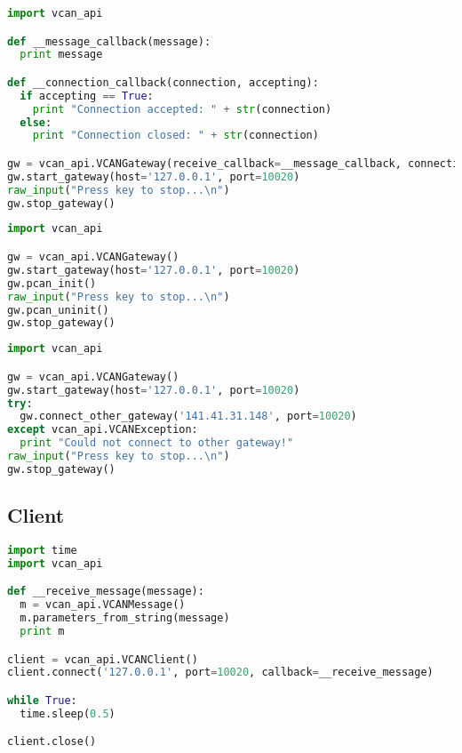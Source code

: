 \begin{lstlisting}[frame=single, language=Python, basicstyle=\footnotesize, caption={Gateway mit Callbacks}, label={lst:bsp_gateway2}]
import vcan_api

def __message_callback(message):
  print message

def __connection_callback(connection, accepting):
  if accepting == True:
    print "Connection accepted: " + str(connection)
  else:
    print "Connection closed: " + str(connection)

gw = vcan_api.VCANGateway(receive_callback=__message_callback, connection_callback=__connection_callback)
gw.start_gateway(host='127.0.0.1', port=10020)
raw_input("Press key to stop...\n")
gw.stop_gateway()
\end{lstlisting}

\begin{lstlisting}[frame=single, language=Python, basicstyle=\footnotesize, caption={Gateway mit PCAN-Anbindung}, label={lst:bsp_gateway3}]
import vcan_api

gw = vcan_api.VCANGateway()
gw.start_gateway(host='127.0.0.1', port=10020)
gw.pcan_init()
raw_input("Press key to stop...\n")
gw.pcan_uninit()
gw.stop_gateway()
\end{lstlisting}

\begin{lstlisting}[frame=single, language=Python, basicstyle=\footnotesize, caption={Gateway mit Verbindung zu anderem Gateway}, label={lst:bsp_gateway4}]
import vcan_api

gw = vcan_api.VCANGateway()
gw.start_gateway(host='127.0.0.1', port=10020)
try:
  gw.connect_other_gateway('141.41.31.148', port=10020)
except vcan_api.VCANException:
  print "Could not connect to other gateway!"
raw_input("Press key to stop...\n")
gw.stop_gateway()
\end{lstlisting}

\subsection{Client}
\label{sec:vcan_client_beispiele}
\begin{lstlisting}[frame=single, language=Python, basicstyle=\footnotesize, caption={Empfangsclient via Callback}, label={lst:bsp_client1}]
import time
import vcan_api

def __receive_message(message):
  m = vcan_api.VCANMessage()
  m.parameters_from_string(message)
  print m

client = vcan_api.VCANClient()
client.connect('127.0.0.1', port=10020, callback=__receive_message)

while True:
  time.sleep(0.5)

client.close()
\end{lstlisting}

